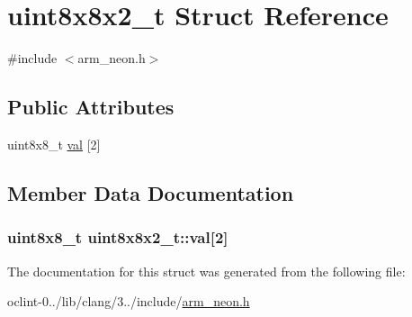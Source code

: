 \hypertarget{structuint8x8x2__t}{\section{uint8x8x2\-\_\-t Struct Reference}
\label{structuint8x8x2__t}
}


{\ttfamily \#include $<$arm\-\_\-neon.\-h$>$}

\subsection*{Public Attributes}
\begin{DoxyCompactItemize}
\item 
uint8x8\-\_\-t \hyperlink{structuint8x8x2__t_a6686ee0ab46c3a82908796baee91cbd6}{val} \mbox{[}2\mbox{]}
\end{DoxyCompactItemize}


\subsection{Member Data Documentation}
\hypertarget{structuint8x8x2__t_a6686ee0ab46c3a82908796baee91cbd6}{
\subsubsection[{val}]{\setlength{\rightskip}{0pt plus 5cm}uint8x8\-\_\-t uint8x8x2\-\_\-t\-::val\mbox{[}2\mbox{]}}}\label{structuint8x8x2__t_a6686ee0ab46c3a82908796baee91cbd6}


The documentation for this struct was generated from the following file\-:\begin{DoxyCompactItemize}
\item 
oclint-\/0../lib/clang/3../include/\hyperlink{arm__neon_8h}{arm\-\_\-neon.\-h}\end{DoxyCompactItemize}
